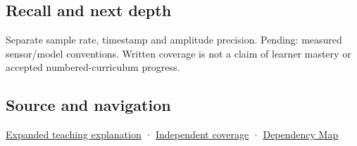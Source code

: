 \subsection{Recall and next depth}\label{appendix-1077ea8fc737-recall-and-next-depth}

Separate sample rate, timestamp and amplitude precision. Pending: measured sensor/model conventions. Written coverage is not a claim of learner mastery or accepted numbered-curriculum progress.

\subsection{Source and navigation}\label{appendix-1077ea8fc737-source-and-navigation}

\hyperref[04-visual-computing-ii-ch042-sampling-is-a-question-of-what-remains-distinguishable]{Expanded teaching explanation} · \hyperref[appendix-fd090d982a15-xr01---independent-seeing-and-representation-source]{Independent coverage} · \hyperref[appendix-4ad47bdd269a]{Dependency Map}
